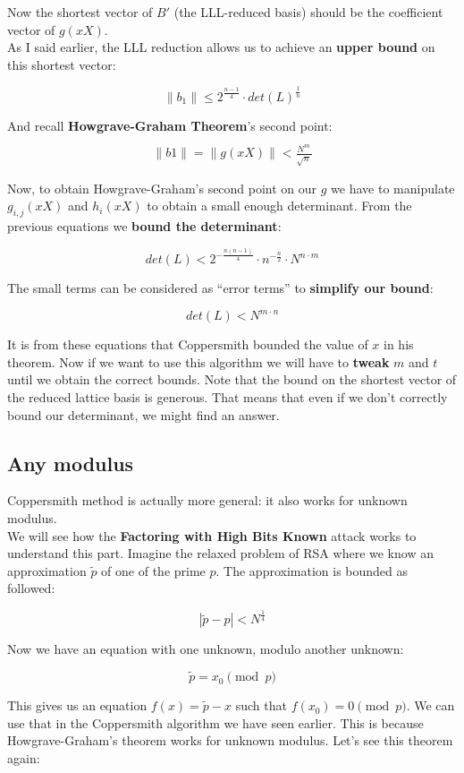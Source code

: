 \documentclass[a4paper,11pt]{article}
\begin{document}
Now the shortest vector of $B'$ (the LLL-reduced basis) should be the coefficient vector of $g(xX)$. \\

As I said earlier, the LLL reduction allows us to achieve an \textbf{upper bound} on this shortest vector:

\[ \|b_1\| \leq 2^{\frac{n-1}{4}} \cdot det(L)^{\frac{1}{n}} \]

And recall \textbf{Howgrave-Graham Theorem}'s second point:

\[ \|b1\| = \|g(xX)\| < \frac{_{N^m}}{^{\sqrt{n}}} \]

Now, to obtain Howgrave-Graham's second point on our $g$ we have to manipulate $g_{i,j}(xX)$ and $h_i(xX)$ to obtain a small enough determinant. From the previous equations we \textbf{bound the determinant}:

\[ det(L) < 2^{-\frac{n(n-1)}{4}} \cdot n^{-\frac{n}{2}} \cdot N^{n \cdot m} \]

The small terms can be considered as ``error terms'' to \textbf{simplify our bound}:

\[ det(L) < N^{m \cdot n}\]

It is from these equations that Coppersmith bounded the value of $x$ in his theorem. Now if we want to use this algorithm we will have to \textbf{tweak} $m$ and $t$ until we obtain the correct bounds. Note that the bound on the shortest vector of the reduced lattice basis is generous. That means that even if we don't correctly bound our determinant, we might find an answer.

\subsection{Any modulus}\label{anymodulus}

Coppersmith method is actually more general: it also works for unknown modulus.\\
We will see how the \textbf{Factoring with High Bits Known} attack works to understand this part. Imagine the relaxed problem of RSA where we know an approximation $\tilde{p}$ of one of the prime $p$. The approximation is bounded as followed:

\[ |\tilde{p} - p| < N^{\frac{1}{4}} \]

Now we have an equation with one unknown, modulo another unknown:

\[ \tilde{p} = x_0 \pmod{p} \]

This gives us an equation $f(x) = \tilde{p} - x$ such that $f(x_0) = 0 \pmod{p}$. We can use that in the Coppersmith algorithm we have seen earlier. This is because Howgrave-Graham's theorem works for unknown modulus. Let's see this theorem again:
\end{document}
